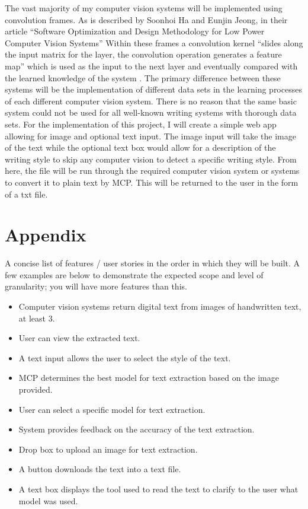 \documentclass[12pt]{article}
\begin{document}
\newline
The vast majority of my computer vision systems will be implemented using convolution frames. As is described by Soonhoi Ha and Eunjin Jeong, in their article “Software Optimization and Design Methodology for Low Power Computer Vision Systems” Within these frames a convolution kernel “slides along the input matrix for the layer, the convolution operation generates a feature map” which is used as the input to the next layer and eventually compared with the learned knowledge of the system \cite{10.1145/3687310}. The primary difference between these systems will be the implementation of different data sets in the learning processes of each different computer vision system. There is no reason that the same basic system could not be used for all well-known writing systems with thorough data sets.
\newline
For the implementation of this project, I will create a simple web app allowing for image and optional text input. The image input will take the image of the text while the optional text box would allow for a description of the writing style to skip any computer vision to detect a specific writing style. From here, the file will be run through the required computer vision system or systems to convert it to plain text by MCP. This will be returned to the user in the form of a txt file.

\newpage
\section*{Appendix}
A concise list of features / user stories in the order in which they will be built. A few examples are below to demonstrate the expected scope and level of granularity; you will have more features than this.
\begin{itemize}
	\item Computer vision systems return digital text from images of handwritten text, at least 3.
	\item User can view the extracted text.
	\item A text input allows the user to select the style of the text.
	\item MCP determines the best model for text extraction based on the image provided.
	\item User can select a specific model for text extraction.
	\item System provides feedback on the accuracy of the text extraction.
	\item Drop box to upload an image for text extraction.
	\item A button downloads the text into a text file.
	\item A text box displays the tool used to read the text to clarify to the user what model was used.
\end{itemize}




\end{document}
